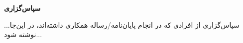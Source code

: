 {
    \centering
    \textbf{سپاس‌گزاری}
    \par
}

\vspace{\baselineskip}
...سپاس‌گزاری از افرادی که در انجام پایان‌نامه/رساله همکاری داشته‌اند، در این‌جا نوشته شود...
